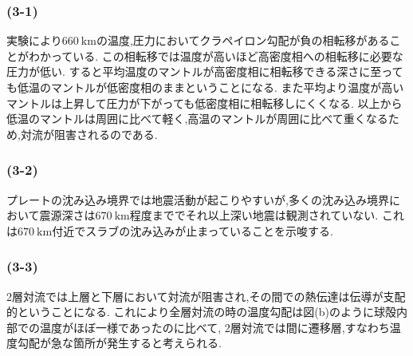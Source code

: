 \subsubsection*{(3-1)}
実験により$660\ \si{\kilo\metre}$の温度,圧力においてクラペイロン勾配が負の相転移があることがわかっている.
この相転移では温度が高いほど高密度相への相転移に必要な圧力が低い.
すると平均温度のマントルが高密度相に相転移できる深さに至っても低温のマントルが低密度相のままということになる.
また平均より温度が高いマントルは上昇して圧力が下がっても低密度相に相転移しにくくなる.
以上から低温のマントルは周囲に比べて軽く,高温のマントルが周囲に比べて重くなるため,対流が阻害されるのである.
\subsubsection*{(3-2)}
プレートの沈み込み境界では地震活動が起こりやすいが,多くの沈み込み境界において震源深さは$670\ \si{\kilo\metre}$程度まででそれ以上深い地震は観測されていない.
これは$670\ \si{\kilo\metre}$付近でスラブの沈み込みが止まっていることを示唆する.
\subsubsection*{(3-3)}
2層対流では上層と下層において対流が阻害され,その間での熱伝達は伝導が支配的ということになる.
これにより全層対流の時の温度勾配は図(b)のように球殻内部での温度がほぼ一様であったのに比べて,
2層対流では間に遷移層,すなわち温度勾配が急な箇所が発生すると考えられる.
